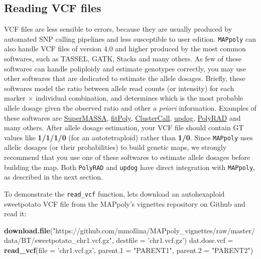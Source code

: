 \documentclass[
]{article}
\newenvironment{Shaded}{}{}
\newcommand{\DataTypeTok}[1]{\textcolor[rgb]{0.56,0.13,0.00}{#1}}
\newcommand{\KeywordTok}[1]{\textcolor[rgb]{0.00,0.44,0.13}{\textbf{#1}}}
\newcommand{\NormalTok}[1]{#1}
\newcommand{\StringTok}[1]{\textcolor[rgb]{0.25,0.44,0.63}{#1}}
\begin{document}
\hypertarget{read_vcf}{%
\subsection{Reading VCF files}\label{read_vcf}}

VCF files are less sensible to errors, because they are usually produced
by automated SNP calling pipelines and less susceptible to user edition.
\texttt{MAPpoly} can also handle VCF files of version 4.0 and higher
produced by the most common softwares, such as TASSEL, GATK, Stacks and
many others. As few of these softwares can handle poliploidy and
estimate genotypes correctly, you may use other softwares that are
dedicated to estimate the allele dosages. Briefly, these softwares model
the ratio between allele read counts (or intensity) for each marker
\(\times\) individual combination, and determines which is the most
probable allele dosage given the observed ratio and other \emph{a
priori} information. Examples of these softwares are
\href{http://statgen.esalq.usp.br/SuperMASSA/}{SuperMASSA},
\href{https://cran.r-project.org/web/packages/fitPoly/index.html}{fitPoly},
\href{https://potatobreeding.cals.wisc.edu/wp-content/uploads/sites/161/2017/08/ClusterCall_Download.zip}{ClusterCall},
\href{https://cloud.r-project.org/web/packages/updog/index.html}{updog},
\href{https://cran.r-project.org/web/packages/polyRAD/vignettes/polyRADtutorial.html}{PolyRAD}
and many others. After allele dosage estimation, your VCF file should
contain GT values like \textbf{1/1/1/0} (for an autotetraploid) rather
than \textbf{1/0}. Since \texttt{MAPpoly} uses allelic dosages (or their
probabilities) to build genetic maps, we strongly recommend that you use
one of these softwares to estimate allele dosages before building the
map. Both \texttt{PolyRAD} and \texttt{updog} have direct integration
with \texttt{MAPpoly}, as described in the next section.

To demonstrate the \texttt{read\_vcf} function, lets download an
autohexaploid sweetpotato VCF file from the MAPpoly's vignettes
repository on Github and read it:

\begin{Shaded}
\begin{Highlighting}[]
\KeywordTok{download.file}\NormalTok{(}\StringTok{"https://github.com/mmollina/MAPpoly_vignettes/raw/master/data/BT/sweetpotato_chr1.vcf.gz"}\NormalTok{, }\DataTypeTok{destfile =} \StringTok{'chr1.vcf.gz'}\NormalTok{)}
\NormalTok{dat.dose.vcf =}\StringTok{ }\KeywordTok{read_vcf}\NormalTok{(}\DataTypeTok{file =} \StringTok{'chr1.vcf.gz'}\NormalTok{, }\DataTypeTok{parent.1 =} \StringTok{"PARENT1"}\NormalTok{, }\DataTypeTok{parent.2 =} \StringTok{"PARENT2"}\NormalTok{)}
\end{Highlighting}
\end{Shaded}
\end{document}
